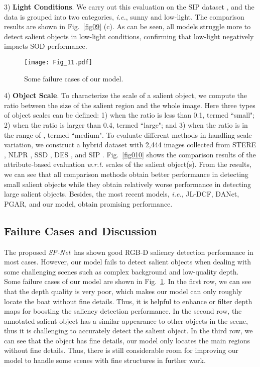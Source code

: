 \documentclass[10pt,twocolumn,letterpaper]{article}
\def\ie{\emph{i.e.}}
\def\ours{\emph{SP-Net}}
\begin{document}
3) \textbf{Light Conditions}. We carry out this evaluation on the SIP dataset \cite{fan2019rethinking}, and the data is grouped into two categories, \ie, sunny and low-light. The comparison results are shown in Fig.~\ref{fig09} (c). As can be seen, all models struggle more to detect salient objects in low-light conditions, confirming that low-light negatively impacts SOD performance.


\begin{figure}[t!]
	\begin{centering} \texttt{[image: Fig\_11.pdf]}\caption{Some failure cases of our model.} \label{fig011}
	\end{centering}
\end{figure}

4) \textbf{Object Scale}. To characterize the scale of a salient object, we compute the ratio between the size of the salient region and the whole image. Here three types of object scales can be defined: 1) when the ratio is less than 0.1, termed ``small"; 2) when the ratio is larger than 0.4, termed ``large"; and 3) when the ratio is in the range of , termed ``medium". To evaluate different methods in handling scale variation, we construct a hybrid dataset with 2,444 images collected from STERE \cite{niu2012leveraging}, NLPR \cite{peng2014rgbd}, SSD \cite{zhu2017three}, DES \cite{cheng2014depth}, and SIP \cite{fan2019rethinking}. Fig.~\ref{fig010} shows the comparison results of the attribute-based evaluation \emph{w.r.t.} scales of the salient object(s). From the results, we can see that all comparison methods obtain better performance in detecting small salient objects while they obtain relatively worse performance in detecting large salient objects. Besides, the most recent models, \ie, JL-DCF, DANet, PGAR, and our model, obtain promising performance.




\subsection{Failure Cases and Discussion}

The proposed \ours~has shown good RGB-D saliency detection performance in most cases. However, our model fails to detect salient objects when dealing with some challenging scenes such as complex background and low-quality depth. Some failure cases of our model are shown in Fig.~\ref{fig011}. In the first row, we can see that the depth quality is very poor, which makes our model can only roughly locate the boat without fine details. Thus, it is helpful to enhance or filter depth maps for boosting the saliency detection performance. In the second row, the annotated salient object has a similar appearance to other objects in the scene, thus it is challenging to accurately detect the salient object. In the third row, we can see that the object has fine details, our model only locates the main regions without fine details. Thus, there is still considerable room for improving our model to handle some scenes with fine structures in further work.
\end{document}
